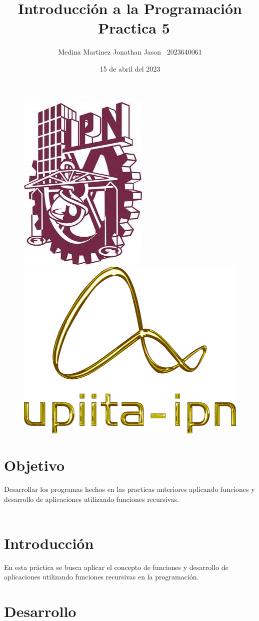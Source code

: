 \documentclass{article}
\title{Introducción a la Programación \ Practica 5}
\author{Medina Martinez Jonathan Jason \ 2023640061}
\date{15 de abril del 2023}
\begin{document}
	
	\fontsize{12}{16}\selectfont
	
	\begin{figure}[t] %
		
		\includegraphics[width=2.5 cm]{Logo1.jpeg}
		\hfill
		\includegraphics[width=3 cm]{Logo2.png}
		
	\end{figure}
	
	\maketitle %
	\newpage
	
	\tableofcontents %
	\newpage
	
	\section{Objetivo}
	
	Desarrollar los programas hechos en las practicas anteriores aplicando funciones y desarrollo de aplicaciones utilizando funciones recursivas.
	\\
	\\
	
	\section{Introducción}
	
	En esta práctica se busca aplicar el concepto de funciones y desarrollo de aplicaciones utilizando funciones recursivas en la programación.
	
	\newpage
	\section{Desarrollo}
	
\end{document}

